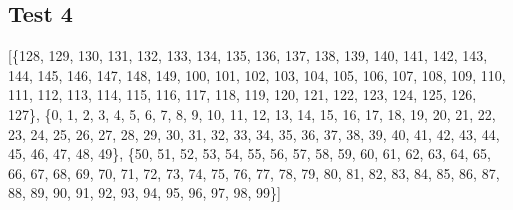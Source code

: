 \documentclass{article}
\begin{document}
\subsection{Test 4}
    \begin{center}
    \end{center}
      [\{128, 129, 130, 131, 132, 133, 134, 135, 136, 137, 138, 139, 140, 141, 142, 143, 144, 145, 146, 147, 148, 149, 100, 101, 102, 103, 104, 105, 106, 107, 108, 109, 110, 111, 112, 113, 114, 115, 116, 117, 118, 119, 120, 121, 122, 123, 124, 125, 126, 127\}, \{0, 1, 2, 3, 4, 5, 6, 7, 8, 9, 10, 11, 12, 13, 14, 15, 16, 17, 18, 19, 20, 21, 22, 23, 24, 25, 26, 27, 28, 29, 30, 31, 32, 33, 34, 35, 36, 37, 38, 39, 40, 41, 42, 43, 44, 45, 46, 47, 48, 49\}, \{50, 51, 52, 53, 54, 55, 56, 57, 58, 59, 60, 61, 62, 63, 64, 65, 66, 67, 68, 69, 70, 71, 72, 73, 74, 75, 76, 77, 78, 79, 80, 81, 82, 83, 84, 85, 86, 87, 88, 89, 90, 91, 92, 93, 94, 95, 96, 97, 98, 99\}]
\end{document}
